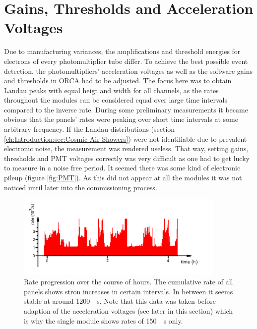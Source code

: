   \section{Gains, Thresholds and Acceleration Voltages}
  \label{ch:The muon detection system:sec:Gains, Thresholds and Acceleration Voltages}
	Due to manufacturing variances, the amplifications and threshold energies for electrons of every photomultiplier tube differ.
	To achieve the best possible event detection, the photomultipliers' acceleration voltages as well as the software gains and thresholds in ORCA had to be adjusted.
	The focus here was to obtain Landau peaks with equal heigt and width for all channels, as the rates throughout the modules can be considered equal over large time intervals compared to the inverse rate.
	During some preliminary measurements it became obvious that the panels' rates were peaking over short time intervals at some arbitrary frequency. If the Landau distributions (section \ref{ch:Introduction:sec:Cosmic Air Showers}) were not identifiable due to prevalent electronic noise, the measurement was rendered useless. That way, setting gains, thresholds and PMT voltages correctly was very difficult as one had to get lucky to measure in a noise free period. It seemed there was some kind of electronic pileup (figure \ref{fig:PMT}). As this did not appear at all the modules it was not noticed until later into the commissioning process.
  \begin{figure}
   \centering
   \includegraphics[width=0.9\textwidth]{graphics/setup/Noise_Rate_Problem_cutout_m.png}
   \caption[Muon modules' rate: noise problems]{Rate progression over the course of hours. The cumulative rate of all panels shows stron increases in certain intervals. In between it seems stable at around \SI{1200}{\per\second}. Note that this data was taken before adaption of the acceleration voltages (see later in this section) which is why the single module shows rates of \SI{150}{\per\second} only. }
  \end{figure}
  
